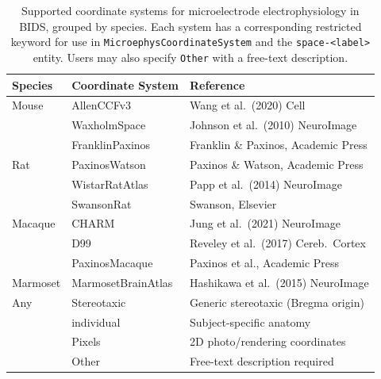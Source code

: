 \documentclass[fleqn,10pt]{article}
\begin{document}
\begin{table}[H]
	\centering
	\caption{Supported coordinate systems for microelectrode electrophysiology in BIDS, grouped by species.
		Each system has a corresponding restricted keyword for use in \texttt{MicroephysCoordinateSystem} and the \texttt{space-<label>} entity.
		Users may also specify \texttt{Other} with a free-text description.
	}
	\label{tab:coordsystems}
	\begin{tabular}{l l l}
		\toprule
		\textbf{Species} & \textbf{Coordinate System} & \textbf{Reference}                    \\
		\midrule
		Mouse            & AllenCCFv3                 & Wang et al.\ (2020) Cell              \\
		                 & WaxholmSpace               & Johnson et al.\ (2010) NeuroImage     \\
		                 & FranklinPaxinos            & Franklin \& Paxinos, Academic Press   \\
		\midrule
		Rat              & PaxinosWatson              & Paxinos \& Watson, Academic Press     \\
		                 & WistarRatAtlas             & Papp et al.\ (2014) NeuroImage        \\
		                 & SwansonRat                 & Swanson, Elsevier                     \\
		\midrule
		Macaque          & CHARM                      & Jung et al.\ (2021) NeuroImage        \\
		                 & D99                        & Reveley et al.\ (2017) Cereb.\ Cortex \\
		                 & PaxinosMacaque             & Paxinos et al., Academic Press        \\
		\midrule
		Marmoset         & MarmosetBrainAtlas         & Hashikawa et al.\ (2015) NeuroImage   \\
		\midrule
		Any              & Stereotaxic                & Generic stereotaxic (Bregma origin)   \\
		                 & individual                 & Subject-specific anatomy              \\
		                 & Pixels                     & 2D photo/rendering coordinates        \\
		                 & Other                      & Free-text description required        \\
		\bottomrule
	\end{tabular}
\end{table}
\end{document}
